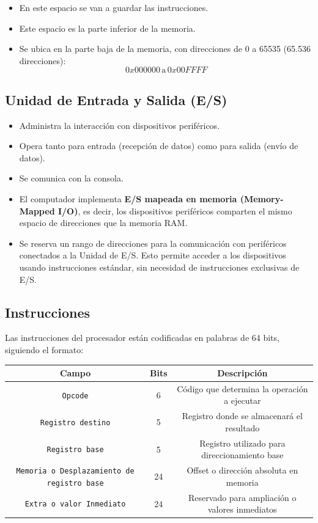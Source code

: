 \documentclass{article}
\begin{document}
\begin{itemize}
    \item En este espacio se van a guardar las instrucciones.
    \item Este espacio es la parte inferior de la memoria.
    \item Se ubica en la parte baja de la memoria, con direcciones de 0 a 65535 (65.536 direcciones):
    \[
    0x000000 \, \text{a} \, 0x00FFFF
    \]
\end{itemize}


\subsection{Unidad de Entrada y Salida (E/S)}

\begin{itemize}
    \item Administra la interacción con dispositivos periféricos.
    \item Opera tanto para entrada (recepción de datos) como para salida (envío de datos).
    \item Se comunica con la consola.
    \item El computador implementa \textbf{E/S mapeada en memoria (Memory-Mapped I/O)}, es decir, los dispositivos periféricos comparten el mismo espacio de direcciones que la memoria RAM.
    \item Se reserva un rango de direcciones para la comunicación con periféricos conectados a la Unidad de E/S. Esto permite acceder a los dispositivos usando instrucciones estándar, sin necesidad de instrucciones exclusivas de E/S.
\end{itemize}


\subsection{Instrucciones}

Las instrucciones del procesador están codificadas en palabras de 64 bits, siguiendo el formato:

\begin{table}[h!]
    \centering
    \begin{tabular}{|c|c|c|}
    \hline
    \textbf{Campo} & \textbf{Bits} & \textbf{Descripción} \\
    \hline
    \texttt{Opcode} & 6 & Código que determina la operación a ejecutar \\
    \texttt{Registro destino} & 5 & Registro donde se almacenará el resultado \\
    \texttt{Registro base} & 5 & Registro utilizado para direccionamiento base \\
    \texttt{Memoria o Desplazamiento de registro base} & 24 & Offset o dirección absoluta en memoria \\
    \texttt{Extra o valor Inmediato} & 24 & Reservado para ampliación o valores inmediatos \\
    \hline
    \end{tabular}
\end{table}
\end{document}
